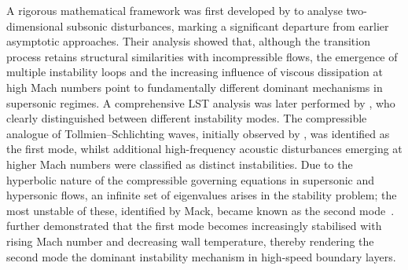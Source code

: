 A rigorous mathematical framework was first developed by \citet{LeesReshotko1962} to analyse two-dimensional subsonic disturbances, marking a significant departure from earlier asymptotic approaches. Their analysis showed that, although the transition process retains structural similarities with incompressible flows, the emergence of multiple instability loops and the increasing influence of viscous dissipation at high Mach numbers point to fundamentally different dominant mechanisms in supersonic regimes. A comprehensive \gls{LST} analysis was later performed by \citet{Mack1963,Mack1964}, who clearly distinguished between different instability modes. The compressible analogue of Tollmien--Schlichting waves, initially observed by \citet{LeesLin1946}, was identified as the first mode, whilst additional high-frequency acoustic disturbances emerging at higher Mach numbers were classified as distinct instabilities. Due to the hyperbolic nature of the compressible governing equations in supersonic and hypersonic flows, an infinite set of eigenvalues arises in the stability problem; the most unstable of these, identified by Mack, became known as the second mode~\citep{Hudson1997}. \citet{Mack1975} further demonstrated that the first mode becomes increasingly stabilised with rising Mach number and decreasing wall temperature, thereby rendering the second mode the dominant instability mechanism in high-speed boundary layers.


